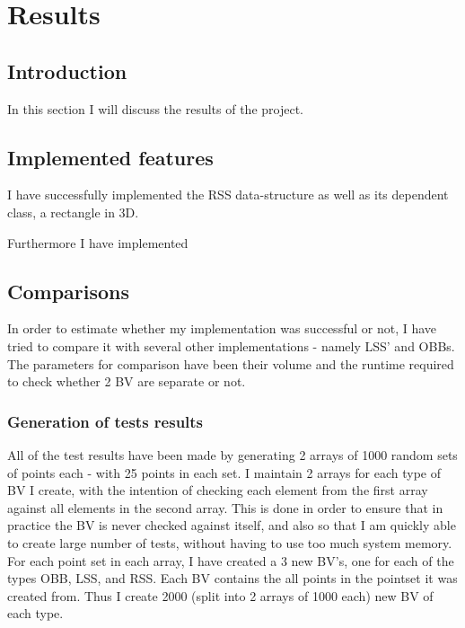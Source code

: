 
\section{Results}
\label{results}
\subsection{Introduction}
In this section I will discuss the results of the project.

\subsection{Implemented features}
I have successfully implemented the RSS data-structure as well as its dependent class, a rectangle in 3D. 

Furthermore I have implemented

\subsection{Comparisons}

In order to estimate whether my implementation was successful or not, I have tried to compare it with several other implementations - namely LSS' and OBBs. The parameters for comparison have been their volume and the runtime required to check whether 2 BV are separate or not.

\subsubsection{Generation of tests results}
All of the test results have been made by generating 2 arrays of
1000 random sets of points each - with 25 points in each set. I
maintain 2 arrays for each type of BV I create, with the intention of
checking each element from the first array against all elements in the
second array. This is done in order to ensure
that in practice the BV is never checked against itself, and also so
that I am quickly able to create large number of tests, without having
to use too much system memory. \\ 

For each point set in each array, I have created a 3 new BV's, one for
each of the types OBB, LSS, and RSS. Each BV contains the all points
in the pointset it was created from. Thus I create 2000 (split into 2 arrays of 1000 each)
new BV of each type. \\ 

